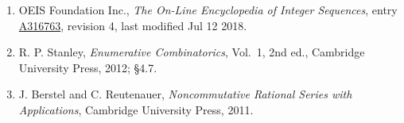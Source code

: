 \documentclass[11pt]{article}
\theoremstyle{definition}
\begin{document}
\begin{enumerate}

\item OEIS Foundation Inc., \emph{The On-Line Encyclopedia of Integer Sequences}, entry \href{https://oeis.org/A316763}{A316763}, revision 4, last modified Jul 12 2018.

\item R. P. Stanley, \emph{Enumerative Combinatorics}, Vol.~1, 2nd ed., Cambridge University Press, 2012; \S4.7.

\item J. Berstel and C. Reutenauer, \emph{Noncommutative Rational Series with Applications}, Cambridge University Press, 2011.

\end{enumerate}
\end{document}
